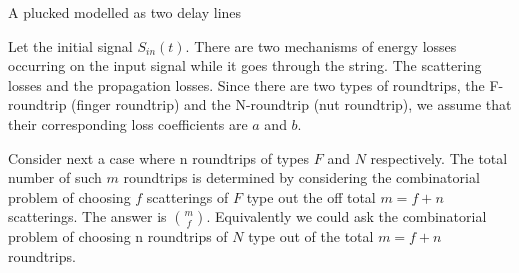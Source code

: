 \documentclass{article}
\begin{document}
A plucked modelled as two delay lines 

Let the initial signal $S_{in}(t)$. There are two mechanisms of energy losses occurring on the input signal while it goes through the string. The scattering losses and the propagation losses. Since there are two types of roundtrips, the F-roundtrip (finger roundtrip) and the N-roundtrip (nut roundtrip), we assume that their corresponding loss coefficients are $a$ and $b$.

Consider next a case where  n roundtrips of types $F$ and $N$ respectively. The total number of such $m$ roundtrips is determined by considering the combinatorial problem of choosing $f$ scatterings of $F$ type out the off total $m = f + n$ scatterings. The answer is $\binom{m}{f}$. Equivalently we could ask the combinatorial problem of choosing n roundtrips of $N$ type out of the total $m = f + n$ roundtrips.
\end{document}
